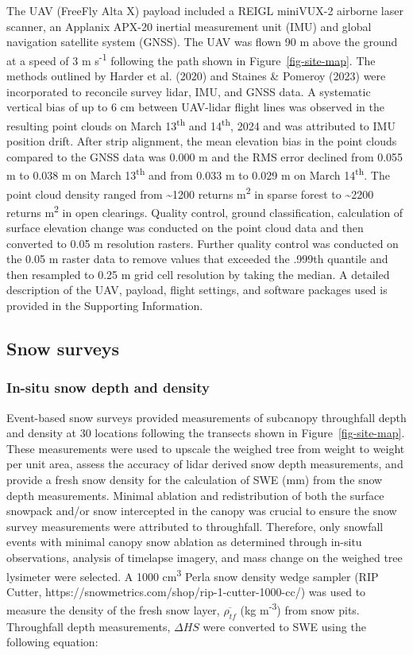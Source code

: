 \documentclass[
  letterpaper,
]{tex/uofsthesis-cs}
\begin{document}
The UAV (FreeFly Alta X) payload included a REIGL miniVUX-2 airborne
laser scanner, an Applanix APX-20 inertial measurement unit (IMU) and
global navigation satellite system (GNSS). The UAV was flown 90 m above
the ground at a speed of 3 m s\textsuperscript{-1} following the path
shown in Figure~\ref{fig-site-map}. The methods outlined by Harder et
al. (2020) and Staines \& Pomeroy (2023) were incorporated to reconcile
survey lidar, IMU, and GNSS data. A systematic vertical bias of up to 6
cm between UAV-lidar flight lines was observed in the resulting point
clouds on March 13\textsuperscript{th} and 14\textsuperscript{th}, 2024
and was attributed to IMU position drift. After strip alignment, the
mean elevation bias in the point clouds compared to the GNSS data was
0.000 m and the RMS error declined from 0.055 m to 0.038 m on March
13\textsuperscript{th} and from 0.033 m to 0.029 m on March
14\textsuperscript{th}. The point cloud density ranged from
\textasciitilde1200 returns m\textsuperscript{2} in sparse forest to
\textasciitilde2200 returns m\textsuperscript{2} in open clearings.
Quality control, ground classification, calculation of surface elevation
change was conducted on the point cloud data and then converted to 0.05
m resolution rasters. Further quality control was conducted on the 0.05
m raster data to remove values that exceeded the .999th quantile and
then resampled to 0.25 m grid cell resolution by taking the median. A
detailed description of the UAV, payload, flight settings, and software
packages used is provided in the Supporting Information.

\subsection{Snow surveys}\label{snow-surveys}

\subsubsection{In-situ snow depth and
density}\label{in-situ-snow-depth-and-density}

Event-based snow surveys provided measurements of subcanopy throughfall
depth and density at 30 locations following the transects shown in
Figure~\ref{fig-site-map}. These measurements were used to upscale the
weighed tree from weight to weight per unit area, assess the accuracy of
lidar derived snow depth measurements, and provide a fresh snow density
for the calculation of SWE (mm) from the snow depth measurements.
Minimal ablation and redistribution of both the surface snowpack and/or
snow intercepted in the canopy was crucial to ensure the snow survey
measurements were attributed to throughfall. Therefore, only snowfall
events with minimal canopy snow ablation as determined through in-situ
observations, analysis of timelapse imagery, and mass change on the
weighed tree lysimeter were selected. A 1000 cm\textsuperscript{3} Perla
snow density wedge sampler (RIP Cutter,
https://snowmetrics.com/shop/rip-1-cutter-1000-cc/) was used to measure
the density of the fresh snow layer, \(\overline{\rho_{tf}}\) (kg
m\textsuperscript{-3}) from snow pits. Throughfall depth measurements,
\(\Delta HS\) were converted to SWE using the following equation:
\end{document}
